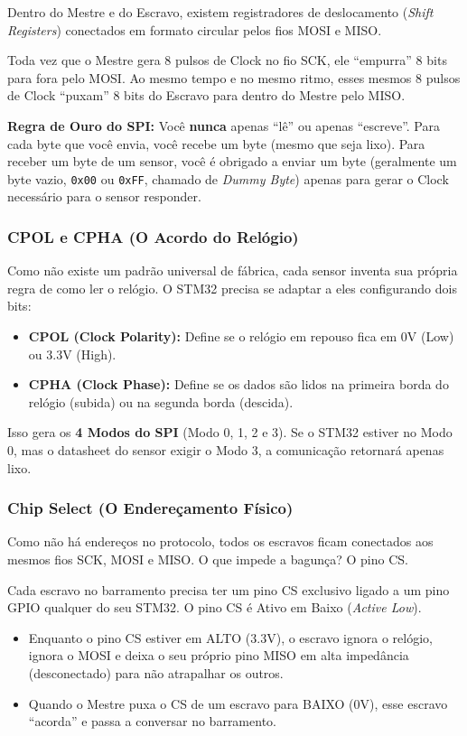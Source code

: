 \documentclass[12pt,a4paper]{article}
\begin{document}
Dentro do Mestre e do Escravo, existem registradores de deslocamento (\textit{Shift Registers}) conectados em formato circular pelos fios MOSI e MISO.



Toda vez que o Mestre gera 8 pulsos de Clock no fio SCK, ele ``empurra'' 8 bits para fora pelo MOSI. Ao mesmo tempo e no mesmo ritmo, esses mesmos 8 pulsos de Clock ``puxam'' 8 bits do Escravo para dentro do Mestre pelo MISO.

\textbf{Regra de Ouro do SPI:} Você \textbf{nunca} apenas ``lê'' ou apenas ``escreve''. Para cada byte que você envia, você recebe um byte (mesmo que seja lixo). Para receber um byte de um sensor, você é obrigado a enviar um byte (geralmente um byte vazio, \texttt{0x00} ou \texttt{0xFF}, chamado de \textit{Dummy Byte}) apenas para gerar o Clock necessário para o sensor responder.

\subsubsection{CPOL e CPHA (O Acordo do Relógio)}
Como não existe um padrão universal de fábrica, cada sensor inventa sua própria regra de como ler o relógio. O STM32 precisa se adaptar a eles configurando dois bits:
\begin{itemize}
    \item \textbf{CPOL (Clock Polarity):} Define se o relógio em repouso fica em 0V (Low) ou 3.3V (High).
    \item \textbf{CPHA (Clock Phase):} Define se os dados são lidos na primeira borda do relógio (subida) ou na segunda borda (descida).
\end{itemize}
Isso gera os \textbf{4 Modos do SPI} (Modo 0, 1, 2 e 3). Se o STM32 estiver no Modo 0, mas o datasheet do sensor exigir o Modo 3, a comunicação retornará apenas lixo.

\subsubsection{Chip Select (O Endereçamento Físico)}
Como não há endereços no protocolo, todos os escravos ficam conectados aos mesmos fios SCK, MOSI e MISO. O que impede a bagunça? O pino CS.

Cada escravo no barramento precisa ter um pino CS exclusivo ligado a um pino GPIO qualquer do seu STM32. O pino CS é Ativo em Baixo (\textit{Active Low}).
\begin{itemize}
    \item Enquanto o pino CS estiver em ALTO (3.3V), o escravo ignora o relógio, ignora o MOSI e deixa o seu próprio pino MISO em alta impedância (desconectado) para não atrapalhar os outros.
    \item Quando o Mestre puxa o CS de um escravo para BAIXO (0V), esse escravo ``acorda'' e passa a conversar no barramento.
\end{itemize}
\end{document}
